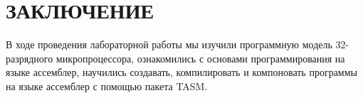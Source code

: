 \section*{ЗАКЛЮЧЕНИЕ}

В ходе проведения лабораторной работы мы
изучили программную модель 32-разрядного микропроцессора, 
ознакомились с основами программирования на языке ассемблер,
научились создавать, компилировать и компоновать программы
на языке ассемблер с помощью пакета TASM.

\newpage

